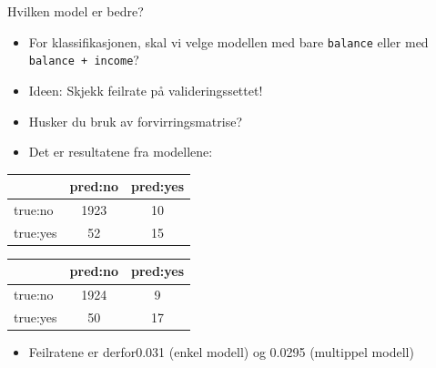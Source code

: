 \documentclass[10pt,ignorenonframetext,]{beamer}
\providecommand{\tightlist}{%
  \setlength{\itemsep}{0pt}\setlength{\parskip}{0pt}}
\begin{document}
\begin{frame}[fragile]

\begin{block}{Hvilken model er bedre?}

\vspace{2mm}

\begin{itemize}
\tightlist
\item
  For klassifikasjonen, skal vi velge modellen med bare \texttt{balance}
  eller med \texttt{balance\ +\ income}?
\end{itemize}

\vspace{2mm}

\begin{itemize}
\tightlist
\item
  Ideen: Skjekk feilrate på valideringssettet!
\end{itemize}

\vspace{2mm}

\begin{itemize}
\tightlist
\item
  Husker du bruk av forvirringsmatrise?
\end{itemize}

\vspace{2mm}

\begin{itemize}
\tightlist
\item
  Det er resultatene fra modellene:
\end{itemize}

\begin{longtable}[]{@{}lcc@{}}
\toprule
& pred:no & pred:yes\tabularnewline
\midrule
\endhead
true:no & 1923 & 10\tabularnewline
true:yes & 52 & 15\tabularnewline
\bottomrule
\end{longtable}

\begin{longtable}[]{@{}lcc@{}}
\toprule
& pred:no & pred:yes\tabularnewline
\midrule
\endhead
true:no & 1924 & 9\tabularnewline
true:yes & 50 & 17\tabularnewline
\bottomrule
\end{longtable}

\begin{itemize}
\tightlist
\item
  Feilratene er derfor0.031 (enkel modell) og 0.0295 (multippel modell)
\end{itemize}

\end{block}

\end{frame}
\end{document}
